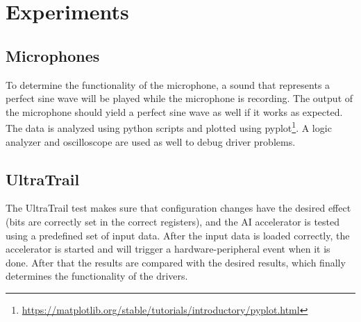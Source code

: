 \section{Experiments}

\subsection{Microphones}

To determine the functionality of the microphone, a sound that represents a perfect sine wave will be
played while the microphone is recording.
The output of the microphone should yield a perfect sine wave as well if it works as expected.\\
The data is analyzed using python scripts and plotted using pyplot\footnote{\url{https://matplotlib.org/stable/tutorials/introductory/pyplot.html}}.
A logic analyzer and oscilloscope are used as well to debug driver problems.

\subsection{UltraTrail}

The UltraTrail test makes sure that configuration changes have the desired effect (bits are correctly set in the correct registers),
and the AI accelerator is tested using a predefined set of input data.
After the input data is loaded correctly, the accelerator is started and will trigger a hardware-peripheral event when it is done.
After that the results are compared with the desired results, which finally determines the functionality of the drivers.
